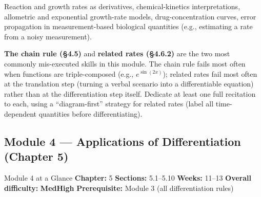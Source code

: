 \documentclass[11pt]{article}
\newcommand{\diffM}{\textcolor{diffamberc}{\textbf{Med}}}
\newcommand{\diffH}{\textcolor{diffredc}{\textbf{High}}}
\begin{document}
\begin{appbox}
Reaction and growth rates as derivatives, chemical-kinetics interpretations, allometric and
exponential growth-rate models, drug-concentration curves, error propagation in
measurement-based biological quantities (e.g., estimating a rate from a noisy measurement).
\end{appbox}

\begin{diffbox}
\textbf{The chain rule (\S4.5)} and \textbf{related rates (\S4.6.2)} are the two most
commonly mis-executed skills in this module. The chain rule fails most often when
functions are triple-composed (e.g., $e^{\sin(2x)}$); related rates fail most often at the
translation step (turning a verbal scenario into a differentiable equation) rather than at
the differentiation step itself. Dedicate at least one full recitation to each, using a
``diagram-first'' strategy for related rates (label all time-dependent quantities before
differentiating).
\end{diffbox}

\subsection*{Module 4 --- Applications of Differentiation (Chapter 5)}

\begin{modulebox}{Module 4 at a Glance}{}
\textbf{Chapter:} 5 \quad\textbf{Sections:} 5.1--5.10 \quad\textbf{Weeks:} 11--13 \quad
\textbf{Overall difficulty:} \diffM\text{--}\diffH \quad
\textbf{Prerequisite:} Module 3 (all differentiation rules)
\end{modulebox}
\end{document}

